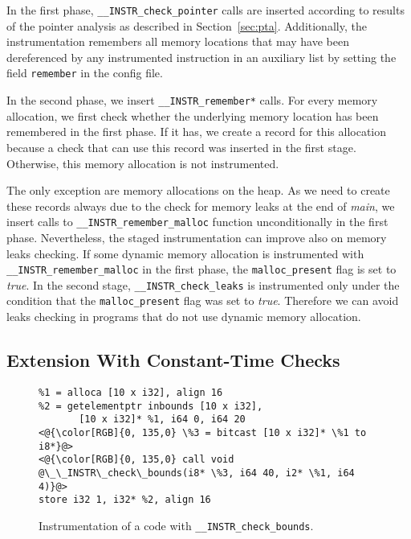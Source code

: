 In the first phase, \texttt{\_\_INSTR\_check\_pointer} calls are inserted
according to results of the pointer analysis as described in
Section~\ref{sec:pta}. Additionally, the instrumentation remembers all memory
locations that may have been dereferenced by any instrumented instruction in an
auxiliary list by setting the field \texttt{remember} in the config file.

In the second phase, we insert \texttt{\_\_INSTR\_remember*} calls. For every
memory allocation, we first check whether the underlying memory location has
been remembered in the first phase.  If it has, we
create a record for this allocation because a check that can use this record
was inserted in the first stage. Otherwise, this memory allocation is not
instrumented.

The only exception are memory allocations on the heap. As we need to
create these records always due to the check for memory leaks at the
end of \emph{main}, we insert calls to
\texttt{\_\_INSTR\_remember\_malloc} function unconditionally in the
first phase.  Nevertheless, the staged instrumentation can improve
also on memory leaks checking. If some dynamic memory allocation is
instrumented with \texttt{\_\_INSTR\_remember\_malloc} in the first
phase, the \texttt{malloc\_present} flag is set to \emph{true}.  In
the second stage, \texttt{\_\_INSTR\_check\_leaks} is instrumented
only under the condition that the \texttt{malloc\_present} flag was
set to \emph{true}. Therefore we can avoid leaks checking in programs
that do not use dynamic memory allocation.


\subsection{Extension With Constant-Time Checks}\label{sec:constant_time}

\begin{figure}[t]
\begin{lstlisting}
%1 = alloca [10 x i32], align 16
%2 = getelementptr inbounds [10 x i32],
       [10 x i32]* %1, i64 0, i64 20
<@{\color[RGB]{0, 135,0} \%3 = bitcast [10 x i32]* \%1 to i8*}@>
<@{\color[RGB]{0, 135,0} call void @\_\_INSTR\_check\_bounds(i8* \%3, i64 40, i2* \%1, i64 4)}@>
store i32 1, i32* %2, align 16
\end{lstlisting}
\caption{Instrumentation of a code with \texttt{\_\_INSTR\_check\_bounds}.}
\label{fig:check_bounds_example}
\end{figure}

